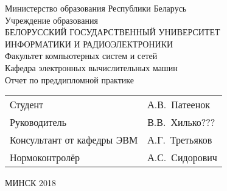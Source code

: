 \begin{titlepage}
  \begin{center}
    Министерство образования Республики Беларусь\\[1em]
    Учреждение образования\\
    БЕЛОРУССКИЙ ГОСУДАРСТВЕННЫЙ УНИВЕРСИТЕТ \\
    ИНФОРМАТИКИ И РАДИОЭЛЕКТРОНИКИ\\[1em]

    Факультет компьютерных систем и сетей \\[0.6cm]

    Кафедра электронных вычислительных машин \\[3.0cm]

    {Отчет по преддипломной практике}\\[4.2cm]

    \begin{tabular}{ p{}p{} }
      Студент & А.В.~Патеенок  \\[1em]

      Руководитель & В.В.~Хилько??? \\[1em]

      Консультант от кафедры ЭВМ & А.Г.~Третьяков\\[1em]

      Нормоконтролёр & А.С.~Сидорович\\
    \end{tabular}

    \vfill
    {\normalsize МИНСК 2018}
  \end{center}
\end{titlepage}
